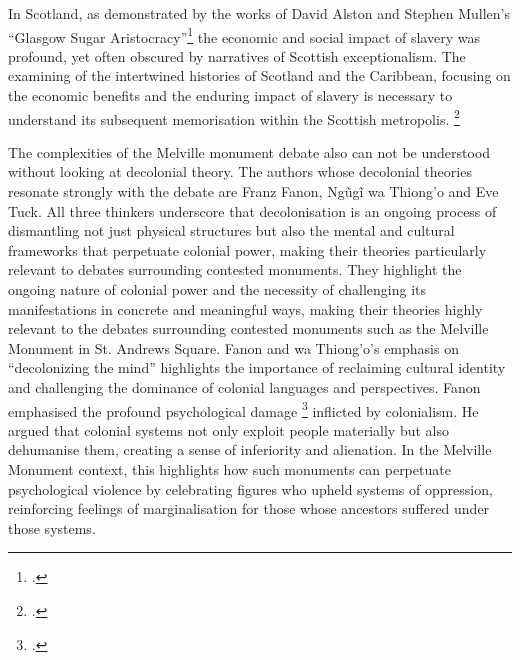 \documentclass{scrartcl}
\renewcommand{\cite}{\parencite}
\begin{document}
In Scotland, as demonstrated by the works of David Alston \cite[][]{alston_2021} and Stephen Mullen's ``Glasgow Sugar Aristocracy''\footcite[``Perhaps so, but by including the substantial estates of merchants with principal interests in Mauritius, and others with no connection to Glasgow, Cooke’s estimations of the city’s West India merchant capital were inflated by including East India fortunes and returned sojourning wealth that improved other areas of Scotland''][p.24]{mullen_2021} the economic and social impact of slavery was profound, yet often obscured by narratives of Scottish exceptionalism. 
The examining of the intertwined histories of Scotland and the Caribbean, focusing on the economic benefits and the enduring impact of slavery is necessary to understand its subsequent memorisation within the Scottish metropolis. \footcite[``Distinct from other European countries, Scotland was a stateless nation and therefore celebrated different types of heroes. Few monuments were dedicated to recent political leaders, and many more commemorated literary or historical figures.''][p.107]{godard_2018}

The complexities of the Melville monument debate also can not be understood without looking at decolonial theory.  The authors whose decolonial theories resonate strongly with the debate are Franz Fanon, Ngũgĩ wa Thiong'o and Eve Tuck. All three thinkers underscore that decolonisation is an ongoing process of dismantling not just physical structures but also the mental and cultural frameworks that perpetuate colonial power, making their theories particularly relevant to debates surrounding contested monuments. They highlight the ongoing nature of colonial power and the necessity of challenging its manifestations in concrete and meaningful ways, making their theories highly relevant to the debates surrounding contested monuments such as the Melville Monument in St. Andrews Square. Fanon and wa Thiong'o's emphasis on ``decolonizing the mind'' highlights the importance of reclaiming cultural identity and challenging the dominance of colonial languages and perspectives. Fanon emphasised the profound psychological damage \footcite[``Violence in the colonies does not only have for
its aim the keeping of these enslaved men at arm's length;
it seeks to dehumanize them. Everything will be done to
wipe out their traditions, to substitute our language for
theirs and to destroy their culture without giving them
ours.''][p.15]{fanon_wretched_2002} inflicted by colonialism. He argued that colonial systems not only exploit people materially but also dehumanise them, creating a sense of inferiority and alienation. In the Melville Monument context, this highlights how such monuments can perpetuate psychological violence by celebrating figures who upheld systems of oppression, reinforcing feelings of marginalisation for those whose ancestors suffered under those systems.
\end{document}
